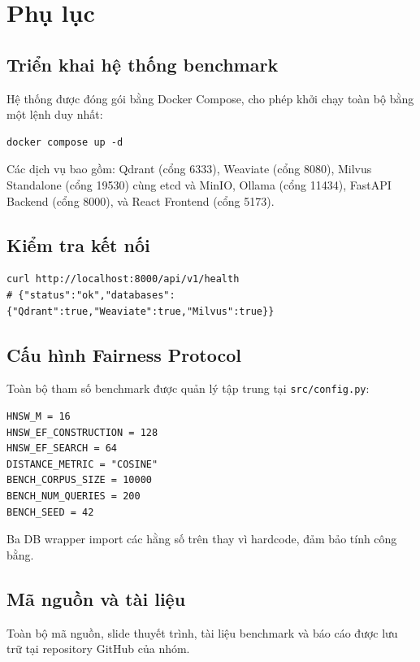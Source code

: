 \section{Phụ lục}

\subsection{Triển khai hệ thống benchmark}

Hệ thống được đóng gói bằng Docker Compose, cho phép khởi chạy toàn bộ bằng một lệnh duy nhất:

\begin{verbatim}
docker compose up -d
\end{verbatim}

Các dịch vụ bao gồm: Qdrant (cổng 6333), Weaviate (cổng 8080), Milvus Standalone (cổng 19530) cùng etcd và MinIO, Ollama (cổng 11434), FastAPI Backend (cổng 8000), và React Frontend (cổng 5173).

\subsection{Kiểm tra kết nối}

\begin{verbatim}
curl http://localhost:8000/api/v1/health
# {"status":"ok","databases":{"Qdrant":true,"Weaviate":true,"Milvus":true}}
\end{verbatim}

\subsection{Cấu hình Fairness Protocol}

Toàn bộ tham số benchmark được quản lý tập trung tại \texttt{src/config.py}:

\begin{verbatim}
HNSW_M = 16
HNSW_EF_CONSTRUCTION = 128
HNSW_EF_SEARCH = 64
DISTANCE_METRIC = "COSINE"
BENCH_CORPUS_SIZE = 10000
BENCH_NUM_QUERIES = 200
BENCH_SEED = 42
\end{verbatim}

Ba DB wrapper import các hằng số trên thay vì hardcode, đảm bảo tính công bằng.

\subsection{Mã nguồn và tài liệu}

Toàn bộ mã nguồn, slide thuyết trình, tài liệu benchmark và báo cáo được lưu trữ tại repository GitHub của nhóm.
